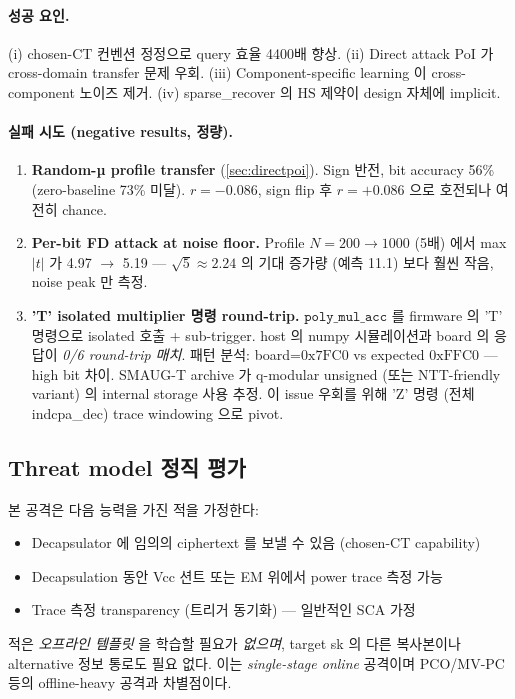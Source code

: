 \documentclass[11pt]{article}
\theoremstyle{plain}
\theoremstyle{definition}
\theoremstyle{remark}
\newcommand{\HS}{\mathrm{HS}}
\begin{document}
\paragraph{성공 요인.}
(i) chosen-CT 컨벤션 정정으로 query 효율 4400배 향상. (ii) Direct attack PoI
가 cross-domain transfer 문제 우회. (iii) Component-specific learning 이
cross-component 노이즈 제거. (iv) sparse\_recover 의 $\HS$ 제약이 design
자체에 implicit.

\paragraph{실패 시도 (negative results, 정량).}
\begin{enumerate}[leftmargin=*]
\item \textbf{Random-µ profile transfer} (\cref{sec:directpoi}). Sign 반전,
   bit accuracy 56\% (zero-baseline 73\% 미달). $r=-0.086$, sign flip 후
   $r=+0.086$ 으로 호전되나 여전히 chance.
\item \textbf{Per-bit FD attack at noise floor.} Profile $N=200 \to 1000$ (5배)
   에서 max$|t|$ 가 4.97 $\to$ 5.19 — $\sqrt{5} \approx 2.24$ 의 기대 증가량
   (예측 11.1) 보다 훨씬 작음, noise peak 만 측정.
\item \textbf{'T' isolated multiplier 명령 round-trip.} $\texttt{poly\_mul\_acc}$ 를
   firmware 의 'T' 명령으로 isolated 호출 + sub-trigger. host 의 numpy 시뮬레이션과
   board 의 응답이 \emph{0/6 round-trip 매치}. 패턴 분석:
   board=$0\mathrm{x}7\mathrm{FC}0$ vs expected $0\mathrm{xFFC}0$ — high bit
   차이. SMAUG-T archive 가 q-modular unsigned (또는 NTT-friendly variant) 의
   internal storage 사용 추정. 이 issue 우회를 위해 'Z' 명령 (전체
   indcpa\_dec) trace windowing 으로 pivot.
\end{enumerate}

\subsection{Threat model 정직 평가}

본 공격은 다음 능력을 가진 적을 가정한다:
\begin{itemize}[leftmargin=*]
\item Decapsulator 에 임의의 ciphertext 를 보낼 수 있음 (chosen-CT capability)
\item Decapsulation 동안 Vcc 션트 또는 EM 위에서 power trace 측정 가능
\item Trace 측정 transparency (트리거 동기화) — 일반적인 SCA 가정
\end{itemize}
적은 \emph{오프라인 템플릿} 을 학습할 필요가 \emph{없으며}, target sk 의 다른
복사본이나 alternative 정보 통로도 필요 없다. 이는 \emph{single-stage online}
공격이며 PCO/MV-PC 등의 offline-heavy 공격과 차별점이다.
\end{document}
